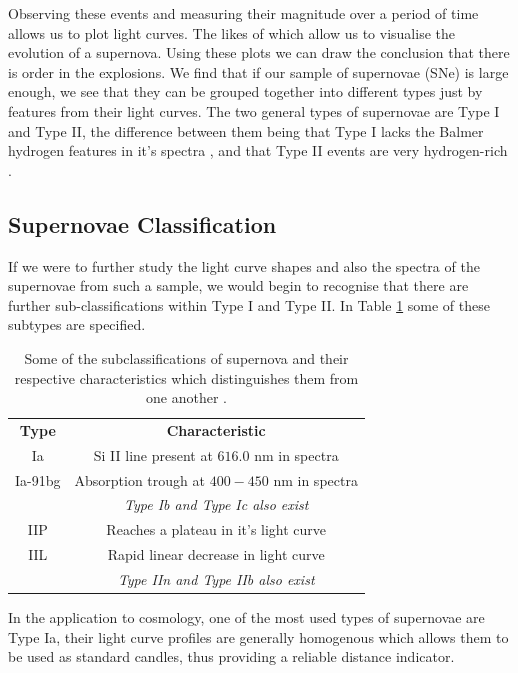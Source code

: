 \documentclass[twocolumn]{revtex4}
\begin{document}
Observing these events and measuring their magnitude over a period of time allows us to plot light curves. The likes of which allow us to visualise the evolution of a supernova. Using these plots we can draw the conclusion that there is order in the explosions. We find that if our sample of supernovae (SNe) is large enough, we see that they can be grouped together into different types just by features from their light curves. The two general types of supernovae are Type I and Type II, the difference between them being that Type I lacks the Balmer hydrogen features in it's spectra \cite{longair}, and that Type II events are very hydrogen-rich \cite{obs_phys_class_sn}.

\vspace{-3ex}
\subsection{Supernovae Classification}
\vspace{-2ex}
If we were to further study the light curve shapes and also the spectra of the supernovae from such a sample, we would begin to recognise that there are further sub-classifications within Type I and Type II. In Table \ref{table:sn_classes} some of these subtypes are specified.

\begin{table}[h!]
\centering
\begin{tabular}{c@{\hskip 20pt}c} 
 \hline
 \textbf{Type} & \textbf{Characteristic} \\ 
 Ia		& Si II line present at $616.0$ nm in spectra \\
 Ia-91bg	& Absorption trough at $400-450$ nm in spectra \\
 		& \em Type Ib and Type Ic also exist \em \\
 IIP 		& Reaches a plateau in it's light curve  \\
 IIL		& Rapid linear decrease in light curve \\
 		& \em Type IIn and Type IIb also exist \em \\
 \hline
\end{tabular}
\caption{Some of the subclassifications of supernova and their respective characteristics which distinguishes them from one another \cite{longair, obs_phys_class_sn}.}
\label{table:sn_classes}
\end{table}

In the application to cosmology, one of the most used types of supernovae are Type Ia, their light curve profiles are generally homogenous which allows them to be used as standard candles, thus providing a reliable distance indicator.  
\end{document}
